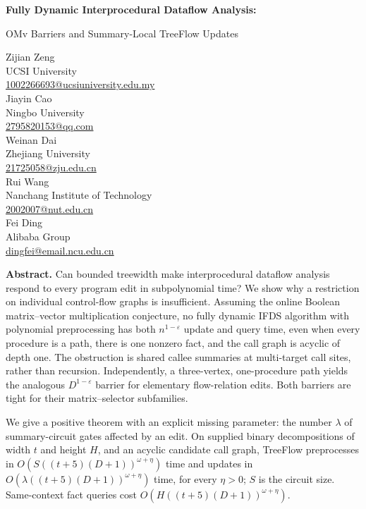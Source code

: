 \documentclass[11pt,letterpaper]{article}
\theoremstyle{definition}
\begin{document}
\begin{titlepage}
\thispagestyle{empty}
\begin{center}
{\LARGE\bfseries Fully Dynamic Interprocedural Dataflow Analysis:\par
\vspace{5pt}
OMv Barriers and Summary-Local TreeFlow Updates\par}
\vspace{18pt}
{\large Zijian Zeng}\\
UCSI University\\
\href{mailto:1002266693@ucsiuniversity.edu.my}{1002266693@ucsiuniversity.edu.my}\\[9pt]
{\large Jiayin Cao}\\
Ningbo University\\
\href{mailto:2795820153@qq.com}{2795820153@qq.com}\\[9pt]
{\large Weinan Dai}\\
Zhejiang University\\
\href{mailto:21725058@zju.edu.cn}{21725058@zju.edu.cn}\\[9pt]
{\large Rui Wang}\\
Nanchang Institute of Technology\\
\href{mailto:2002007@nut.edu.cn}{2002007@nut.edu.cn}\\[9pt]
{\large Fei Ding}\\
Alibaba Group\\
\href{mailto:dingfei@email.ncu.edu.cn}{dingfei@email.ncu.edu.cn}
\end{center}
\vspace{10pt}
\noindent\textbf{Abstract.}\quad
Can bounded treewidth make interprocedural dataflow analysis respond to
every program edit in subpolynomial time? We show why a restriction on
individual control-flow graphs is insufficient. Assuming the online
Boolean matrix--vector multiplication conjecture, no fully dynamic IFDS
algorithm with polynomial preprocessing has both $n^{1-\varepsilon}$
update and query time, even when every procedure is a path, there is one
nonzero fact, and the call graph is acyclic of depth one. The obstruction
is shared callee summaries at multi-target call sites, rather than
recursion. Independently, a three-vertex, one-procedure path yields the
analogous $D^{1-\varepsilon}$ barrier for elementary flow-relation edits.
Both barriers are tight for their matrix--selector subfamilies.

We give a positive theorem with an explicit missing parameter:
the number $\lambda$ of summary-circuit gates affected by an edit.
On supplied binary decompositions of width $t$ and height $H$, and an
acyclic candidate call graph, TreeFlow preprocesses in
$O(S((t+5)(D+1))^{\omega+\eta})$ time and updates in
$O(\lambda((t+5)(D+1))^{\omega+\eta})$ time, for every $\eta>0$;
$S$ is the circuit size. Same-context fact queries cost
$O(H((t+5)(D+1))^{\omega+\eta})$.


\end{titlepage}
\end{document}
